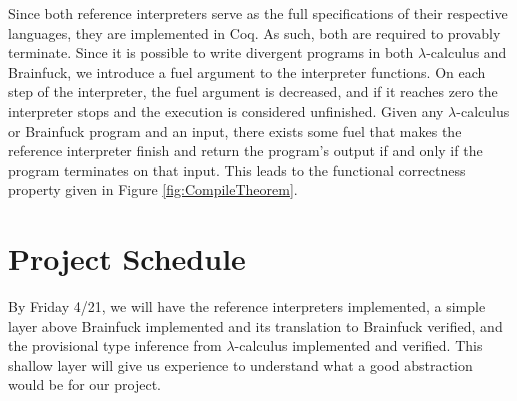 \documentclass[letterpaper,twocolumn,11pt]{article}
\begin{document}

Since both reference interpreters serve as the full specifications of their respective languages, they are implemented in Coq. As such, both are required to provably terminate. Since it is possible to write divergent programs in both $\lambda$-calculus and Brainfuck, we introduce a fuel argument to the interpreter functions. On each step of the interpreter, the fuel argument is decreased, and if it reaches zero the interpreter stops and the execution is considered unfinished. Given any $\lambda$-calculus or Brainfuck program and an input, there exists some fuel that makes the reference interpreter finish and return the program's output if and only if the program terminates on that input. This leads to the functional correctness property given in Figure \ref{fig:CompileTheorem}.

\section{Project Schedule}

By Friday 4/21, we will have the reference interpreters implemented, a simple layer above Brainfuck implemented and its translation to Brainfuck verified, and the provisional type inference from $\lambda$-calculus implemented and verified. This shallow layer will give us experience to understand what a good abstraction would be for our project.
\end{document}
